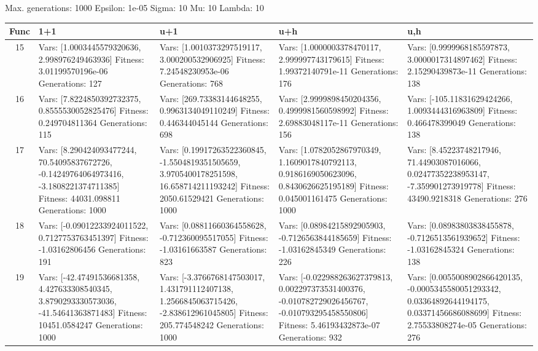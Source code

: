 \documentclass[landscape,11pt]{article}
\begin{document}
\newpage
Max. generations: 1000 Epsilon: 1e-05 Sigma: 10 Mu: 10 Lambda: 10 \\
\begin{tabular}{|c|p{5.4cm}|p{5.4cm}|p{5.4cm}|p{5.4cm}|}
\hline
Func & 1+1 & u+1 & u+h & u,h \\ 
\hline 15 & Vars: [1.0003445579320636, 2.998976249463936] Fitness: 3.01199570196e-06 Generations: 127 & Vars: [1.0010373297519117, 3.000200532906925] Fitness: 7.24548230953e-06 Generations: 768 & Vars: [1.0000003378470117, 2.999997743179615] Fitness: 1.99372140791e-11 Generations: 176 & Vars: [0.9999968185597873, 3.0000017314897462] Fitness: 2.15290439873e-11 Generations: 138 \\
 \hline 
 16 & Vars: [7.8224850392732375, 0.8555530052825476] Fitness: 0.249704811364 Generations: 115 & Vars: [269.73383144648255, 0.9963134049110249] Fitness: 0.446344045144 Generations: 698 & Vars: [2.9999898450204356, 0.4999981560598992] Fitness: 2.69883048117e-11 Generations: 156 & Vars: [-105.11831629424266, 1.0093444316963809] Fitness: 0.466478399049 Generations: 138 \\
 \hline 
 17 & Vars: [8.290424093477244, 70.54095837672726, -0.14249764064973416, -3.1808221374711385] Fitness: 44031.098811 Generations: 1000 & Vars: [0.19917263522360845, -1.5504819351505659, 3.9705400178251598, 16.658714211193242] Fitness: 2050.61529421 Generations: 1000 & Vars: [1.0782052867970349, 1.1609017840792113, 0.9186169050623096, 0.8430626625195189] Fitness: 0.045001161475 Generations: 1000 & Vars: [8.45223748217946, 71.44903087016066, 0.02477352238953147, -7.359901273919778] Fitness: 43490.9218318 Generations: 276 \\
 \hline 
 18 & Vars: [-0.09012233924011522, 0.7127753763451397] Fitness: -1.03162806456 Generations: 191 & Vars: [0.08811660364558628, -0.712360095517055] Fitness: -1.03161663587 Generations: 823 & Vars: [0.08984215892905903, -0.7126563844185659] Fitness: -1.03162845349 Generations: 226 & Vars: [0.08983803838455878, -0.7126513561939652] Fitness: -1.03162845324 Generations: 138 \\
 \hline 
 19 & Vars: [-42.47491536681358, 4.427633308540345, 3.8790293330573036, -41.54641363871483] Fitness: 10451.0584247 Generations: 1000 & Vars: [-3.3766768147503017, 1.431791112407138, 1.2566845063715426, -2.838612961045805] Fitness: 205.774548242 Generations: 1000 & Vars: [-0.022988263627379813, 0.002297373531400376, -0.010782729026456767, -0.010793295458550806] Fitness: 5.46193432873e-07 Generations: 932 & Vars: [0.0055008902866420135, -0.0005345580051293342, 0.03364892644194175, 0.03371456686088699] Fitness: 2.75533808274e-05 Generations: 276 \\
 \hline 
\end{tabular}
\end{document}
